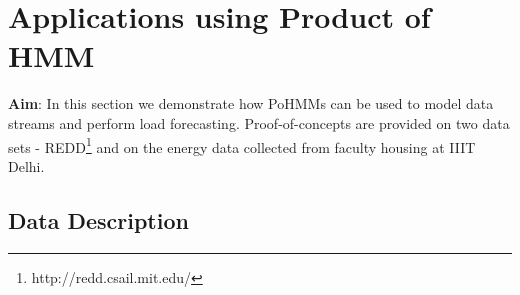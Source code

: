 \documentclass[runningheads,a4paper]{llncs}
\begin{document}
\section{Applications using Product of HMM}
\label{poc}

\textbf{Aim}: In this section we demonstrate how PoHMMs can be used to model data streams and perform load forecasting. Proof-of-concepts are provided on two data sets - REDD\footnote{http://redd.csail.mit.edu/} and on the energy data collected from faculty housing at IIIT Delhi.

\subsection{Data Description} 
\end{document}
